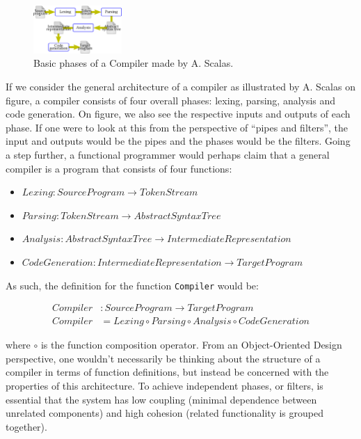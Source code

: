 \begin{figure}[H]
\centering
\includegraphics[width=0.3\textwidth]{Pictures/basic_compiler_phases.png}
\caption{Basic phases of a Compiler made by A. Scalas.}
\label{fig:compiler_phases}
\end{figure}

If we consider the general architecture of a compiler as illustrated by A. Scalas on figure, a compiler consists of four overall phases:
lexing, parsing, analysis and code generation. On figure, we also see the respective inputs and outputs of each phase. If one were to
look at this from the perspective of ``pipes and filters'', the input and outputs would be the pipes and the phases would be the filters.
Going a step further, a functional programmer would perhaps claim that a general compiler is a program that consists of four functions:

\begin{itemize}
  \item $Lexing : SourceProgram \rightarrow TokenStream$
  \item $Parsing : TokenStream \rightarrow AbstractSyntaxTree$
  \item $Analysis : AbstractSyntaxTree \rightarrow IntermediateRepresentation$
  \item $CodeGeneration : IntermediateRepresentation \rightarrow TargetProgram$
\end{itemize}

As such, the definition for the function \texttt{Compiler} would be:

\begin{align*}
  Compiler &: SourceProgram \rightarrow TargetProgram \\
  Compiler &= Lexing \circ Parsing \circ Analysis \circ CodeGeneration
\end{align*}

where $\circ$ is the function composition operator. From an Object-Oriented Design perspective, one wouldn't necessarily be thinking about the structure
of a compiler in terms of function definitions, but instead be concerned with the properties of this architecture. To achieve independent phases, or filters,
is essential that the system has low coupling (minimal dependence between unrelated components) and high cohesion (related functionality is grouped together).

